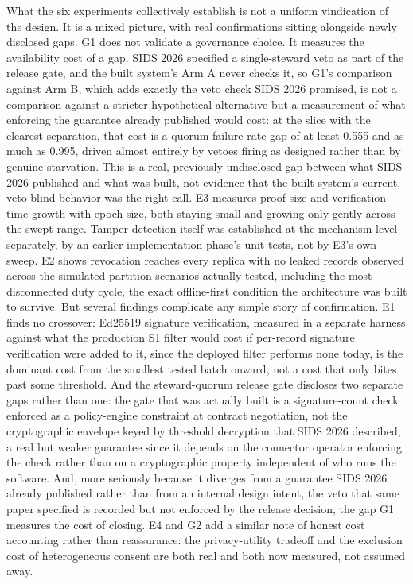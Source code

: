 What the six experiments collectively establish is not a uniform vindication of the design. It is a mixed picture, with real confirmations sitting alongside newly disclosed gaps. G1 does not validate a governance choice. It measures the availability cost of a gap. SIDS 2026 specified a single-steward veto as part of the release gate, and the built system's Arm A never checks it, so G1's comparison against Arm B, which adds exactly the veto check SIDS 2026 promised, is not a comparison against a stricter hypothetical alternative but a measurement of what enforcing the guarantee already published would cost: at the slice with the clearest separation, that cost is a quorum-failure-rate gap of at least 0.555 and as much as 0.995, driven almost entirely by vetoes firing as designed rather than by genuine starvation. This is a real, previously undisclosed gap between what SIDS 2026 published and what was built, not evidence that the built system's current, veto-blind behavior was the right call. E3 measures proof-size and verification-time growth with epoch size, both staying small and growing only gently across the swept range. Tamper detection itself was established at the mechanism level separately, by an earlier implementation phase's unit tests, not by E3's own sweep. E2 shows revocation reaches every replica with no leaked records observed across the simulated partition scenarios actually tested, including the most disconnected duty cycle, the exact offline-first condition the architecture was built to survive. But several findings complicate any simple story of confirmation. E1 finds no crossover: Ed25519 signature verification, measured in a separate harness against what the production S1 filter would cost if per-record signature verification were added to it, since the deployed filter performs none today, is the dominant cost from the smallest tested batch onward, not a cost that only bites past some threshold. And the steward-quorum release gate discloses two separate gaps rather than one: the gate that was actually built is a signature-count check enforced as a policy-engine constraint at contract negotiation, not the cryptographic envelope keyed by threshold decryption that SIDS 2026 described, a real but weaker guarantee since it depends on the connector operator enforcing the check rather than on a cryptographic property independent of who runs the software. And, more seriously because it diverges from a guarantee SIDS 2026 already published rather than from an internal design intent, the veto that same paper specified is recorded but not enforced by the release decision, the gap G1 measures the cost of closing. E4 and G2 add a similar note of honest cost accounting rather than reassurance: the privacy-utility tradeoff and the exclusion cost of heterogeneous consent are both real and both now measured, not assumed away.

